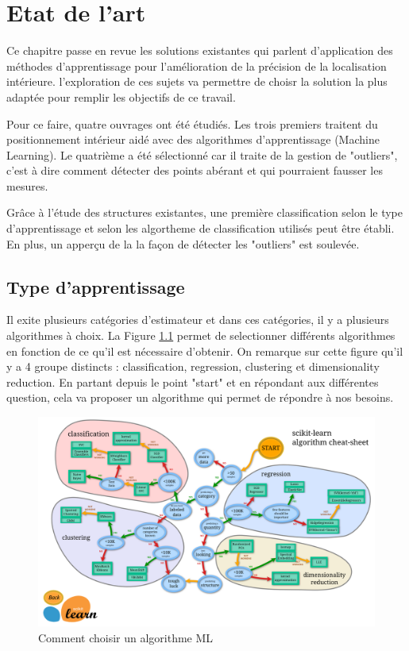 \chapter{Etat de l'art}
Ce chapitre passe en revue les solutions existantes qui parlent d'application des méthodes d'apprentissage pour l'amélioration de la précision de la localisation intérieure. l'exploration de ces sujets va permettre de choisr la solution la plus adaptée pour remplir les objectifs de ce travail.

Pour ce faire, quatre ouvrages ont été étudiés. Les trois premiers traitent du positionnement intérieur aidé avec des algorithmes d'apprentissage (Machine Learning). Le quatrième a été sélectionné car il traite de la gestion de "outliers", c'est à dire comment détecter des points abérant et qui pourraient fausser les mesures. 

Grâce à l'étude des structures existantes, une première classification selon le type d'apprentissage et selon les algortheme de classification utilisés peut être établi. En plus, un apperçu de la la façon de détecter les "outliers" est soulevée.

\section{Type d'apprentissage}
Il exite plusieurs catégories d'estimateur et dans ces catégories, il y a plusieurs algorithmes à choix. La Figure \ref{fig:scikiLearn} permet de selectionner différents algorithmes en fonction de ce qu'il est nécessaire d'obtenir. On remarque sur cette figure qu'il y a 4 groupe distincts : classification, regression, clustering et dimensionality reduction. En partant depuis le point "start" et en répondant aux différentes question, cela va proposer un algorithme qui permet de répondre à nos besoins.

\begin{figure}[htp]
	\begin{center}
		\includegraphics[scale=0.12]{figures/scikiLearn.png}
		\caption{Comment choisir un algorithme ML \cite{scikit}}
		\label{fig:scikiLearn} %
	\end{center}
\end{figure}

